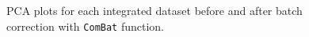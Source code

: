 \begin{figure}%
    \centering
    \qquad
\caption{PCA plots for each integrated dataset before and after batch correction with \texttt{ComBat} function.}
\label{fig:batchcorrection}%
\end{figure}

